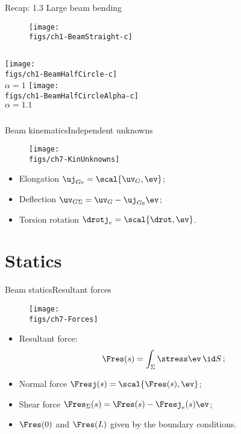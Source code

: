\begin{frame}{Recap: 1.3 Large beam bending}

\vskip-20pt
\begin{figure}
\centering\texttt{[image: \\figs/ch1-BeamStraight-c]}
\end{figure}
\vskip-10pt
\begin{columns}
\centering\texttt{[image: \\figs/ch1-BeamHalfCircle-c]}\\
$\alpha=1$
\centering\texttt{[image: \\figs/ch1-BeamHalfCircleAlpha-c]}\\
$\alpha=1.1$
\end{columns}

\end{frame}

\begin{frame}{Beam kinematics}{Independent unknowns}

\begin{figure}
\centering\texttt{[image: \\figs/ch7-KinUnknowns]}
\end{figure}

\begin{itemize}
\item Elongation $\uj_{Ge}=\scal{\uv_G,\ev}$;
\item Deflection $\uv_{G\Sigma}=\uv_G-\uj_{Ge}\ev$;
\item Torsion rotation $\drotj_e=\scal{\drot,\ev}$.
\end{itemize}

\end{frame}

\section{Statics}

\begin{frame}{Beam statics}{Resultant forces}

\begin{figure}
\centering\texttt{[image: \\figs/ch7-Forces]}
\end{figure}

\begin{itemize}
\item Resultant force:
\begin{displaymath}
\Fres(s)=\int_\Sigma\stress\ev\,\id S\,;
\end{displaymath}
\item Normal force $\Fresj(s)=\scal{\Fres(s),\ev}$;
\item Shear force $\Fres_\Sigma(s)=\Fres(s)-\Fresj_e(s)\ev$;
\item $\Fres(0)$ and $\Fres(L)$ given by the boundary conditions.
\end{itemize}

\end{frame}

